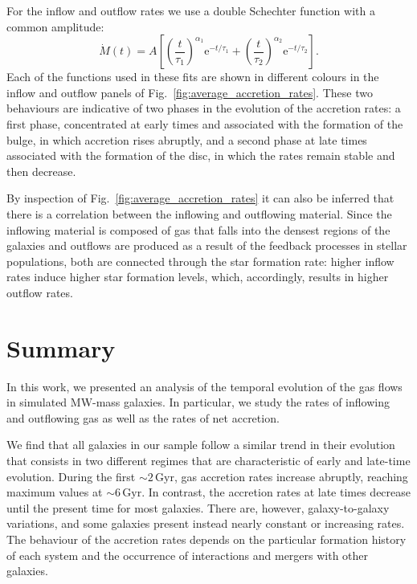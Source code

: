 \documentclass[baaa]{baaa}
\begin{document}
For the inflow and outflow rates we use a double Schechter function with a common amplitude:
\begin{equation*} \dot{M}(t) = A \left[ \left( \frac{t}{\tau_1} \right)^{\alpha_1} \mathrm{e}^{-t / \tau_1} + \left( \frac{t}{\tau_2} \right)^{\alpha_2} \mathrm{e}^{-t / \tau_2} \right]. \end{equation*}
Each of the functions used in these fits are shown in different colours in the inflow and outflow panels of Fig.~\ref{fig:average_accretion_rates}.
These two behaviours are indicative of two phases in the evolution of the accretion rates: a first phase, concentrated at early times and associated with the formation of the bulge, in which accretion rises abruptly, and a second phase at late times associated with the formation of the disc, in which the rates remain stable and then decrease.

By inspection of Fig.~\ref{fig:average_accretion_rates} it can also be inferred that there is a correlation between the inflowing and outflowing material.
Since the inflowing material is composed of gas that falls into the densest regions of the galaxies and outflows are produced as a result of the feedback processes in stellar populations, both are connected through the star formation rate: higher inflow rates induce higher star formation levels, which, accordingly, results in higher outflow rates.

\section{Summary}
\label{sec:summary}

In this work, we presented an analysis of the temporal evolution of the gas flows in simulated MW-mass galaxies.
In particular, we study the rates of inflowing and outflowing gas as well as the rates of net accretion.

We find that all galaxies in our sample follow a similar trend in their evolution that consists in two different regimes that are characteristic of early and late-time evolution.
During the first $\sim 2\,\mathrm{Gyr}$, gas accretion rates increase abruptly, reaching  maximum values at $\sim6\,\mathrm{Gyr}$. In contrast, the accretion rates at late times decrease until the present time for most galaxies.
There are, however, galaxy-to-galaxy variations, and some galaxies present instead nearly constant or increasing rates. The behaviour of the accretion rates depends on the particular
formation history of each system and the occurrence of interactions and mergers with other galaxies.
\end{document}

